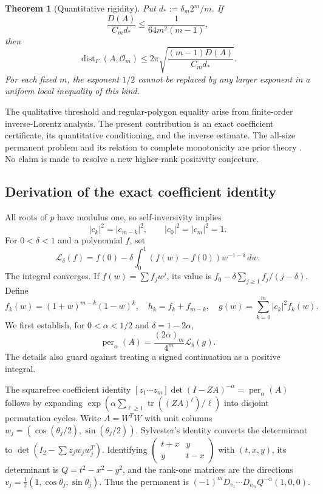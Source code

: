 \documentclass[11pt,a4paper]{article}
\newtheorem{theorem}{Theorem}[section]
\theoremstyle{definition}\newtheorem{definition}[theorem]{Definition}
\theoremstyle{remark}\newtheorem{remark}[theorem]{Remark}
\DeclareMathOperator{\tr}{tr}\DeclareMathOperator{\supp}{supp}\DeclareMathOperator{\TV}{TV}
\numberwithin{equation}{section}
\begin{document}
\begin{theorem}[Quantitative rigidity]\label{S10-rigid}
Put $d_*:=\delta_m2^m/m$. If
\begin{equation}\label{S10-small}
 \frac{D(A)}{C_md_*}\le\frac1{64m^2(m-1)},
\end{equation}
then
\begin{equation}\label{S10-distance}
 \operatorname{dist}_F(A,\mathcal O_m)
 \le2\pi\sqrt{\frac{(m-1)D(A)}{C_md_*}}.
\end{equation}
For each fixed $m$, the exponent $1/2$ cannot be replaced by any larger exponent in a uniform local inequality of this kind.
\end{theorem}
The qualitative threshold and regular-polygon equality arise from finite-order inverse-Lorentz analysis. The present contribution is an exact coefficient certificate, its quantitative conditioning, and the inverse estimate. The all-size permanent problem and its relation to complete monotonicity are prior theory \cite{ref009,ref005}. No claim is made to resolve a new higher-rank positivity conjecture.

\subsection{Derivation of the exact coefficient identity}\label{S10-sec-2}
All roots of $p$ have modulus one, so self-inversivity implies
\[
 |c_k|^2=|c_{m-k}|^2,\qquad |c_0|^2=|c_m|^2=1.
\]
For $0<\delta<1$ and a polynomial $f$, set
\[
 \mathcal L_\delta(f)=f(0)-\delta\int_0^1
 (f(w)-f(0))w^{-1-\delta}\,dw.
\]
The integral converges. If $f(w)=\sum f_jw^j$, its value is
$f_0-\delta\sum_{j\ge1}f_j/(j-\delta)$.
Define
\[
 f_k(w)=(1+w)^{m-k}(1-w)^k,\quad h_k=f_k+f_{m-k},\quad
 g(w)=\sum_{k=0}^m|c_k|^2f_k(w).
\]
We first establish, for $0<\alpha<1/2$ and $\delta=1-2\alpha$,
\begin{equation}\label{S10-basic}
 \operatorname{per}_\alpha(A)=\frac{(2\alpha)_m}{4^m}\mathcal L_\delta(g).
\end{equation}
The details also guard against treating a signed continuation as a positive integral.

The squarefree coefficient identity
$[z_1\cdots z_m]\det(I-ZA)^{-\alpha}=\operatorname{per}_\alpha(A)$
follows by expanding $\exp(\alpha\sum_{\ell\ge1}\tr((ZA)^\ell)/\ell)$ into disjoint permutation cycles. Write $A=W^TW$ with unit columns $w_j=(\cos(\theta_j/2),\sin(\theta_j/2))$. Sylvester's identity converts the determinant to $\det(I_2-\sum z_jw_jw_j^T)$. Identifying
$\left(\begin{smallmatrix}t+x&y\\y&t-x\end{smallmatrix}\right)$ with $(t,x,y)$, its determinant is $Q=t^2-x^2-y^2$, and the rank-one matrices are the directions $v_j=\tfrac12(1,\cos\theta_j,\sin\theta_j)$. Thus the permanent is $(-1)^mD_{v_1}\cdots D_{v_m}Q^{-\alpha}(1,0,0)$.
\end{document}
